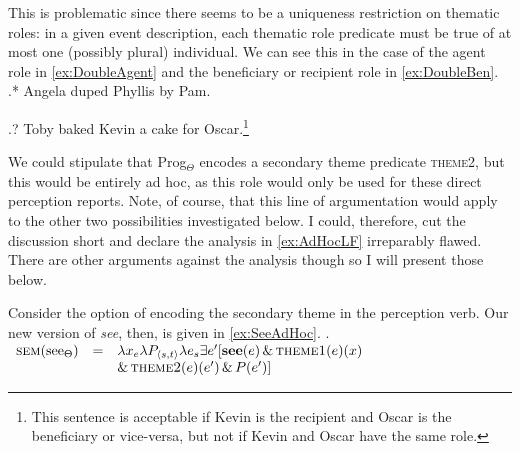 \documentclass[MilwayThesis]{subfiles}
\begin{document}
This is problematic since there seems to be a uniqueness restriction on thematic roles: in a given event description, each thematic role predicate must be true of at most one (possibly plural) individual.
We can see this in the case of the agent role in \cref{ex:DoubleAgent} and the beneficiary or recipient role in \cref{ex:DoubleBen}.
\ex.* \label{ex:DoubleAgent} Angela duped Phyllis by Pam.

\ex.? \label{ex:DoubleBen} Toby baked Kevin a cake for Oscar.\footnote{
	This sentence is acceptable if Kevin is the recipient and Oscar is the beneficiary or vice-versa, but not if Kevin and Oscar have the same role.
}

We could stipulate that Prog$_{\Theta}$ encodes a secondary theme predicate \textsc{theme2}, but this would be entirely ad hoc, as this role would only be used for these direct perception reports.
Note, of course, that this line of argumentation would apply to the other two possibilities investigated below.
I could, therefore, cut the discussion short and declare the analysis in \cref{ex:AdHocLF} irreparably flawed.
There are other arguments against the analysis though so I will present those below.

Consider the option of encoding the secondary theme in the perception verb.
Our new version of \textit{see}, then, is given in \cref{ex:SeeAdHoc}.
\ex.\label{ex:SeeAdHoc}
$
\begin{array}[t]{rcl}
	\textsc{sem}(\text{see}_\Theta) & = & \lambda x_e \lambda P_{\langle s,t\rangle} \lambda e_{s} \exists e^{\prime} [\textbf{see}(e) \,\&\, \textsc{theme1}(e)(x) \\
		& & \&\, \textsc{theme2}(e)(e^{\prime}) \,\&\, P(e^{\prime})]
\end{array}
$
\end{document}
